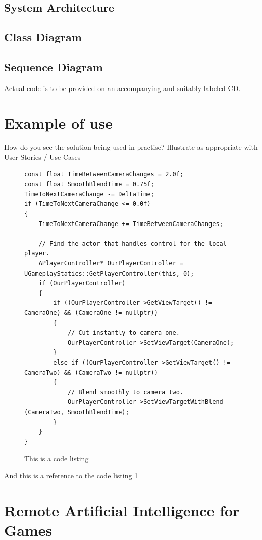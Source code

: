 \documentclass[12pt,a4paper,titlepage]{article}
\begin{document}
\subsection{System Architecture}

\subsection{Class Diagram}

\subsection{Sequence Diagram}

Actual code is to be provided on an accompanying and suitably labeled CD.

\section{Example of use}
How do you see the solution being used in practise? Illustrate as appropriate with User Stories / Use Cases 

\begin{figure}[H]
\begin{lstlisting}
const float TimeBetweenCameraChanges = 2.0f;
const float SmoothBlendTime = 0.75f;
TimeToNextCameraChange -= DeltaTime;
if (TimeToNextCameraChange <= 0.0f)
{
    TimeToNextCameraChange += TimeBetweenCameraChanges;

    // Find the actor that handles control for the local player.
    APlayerController* OurPlayerController = UGameplayStatics::GetPlayerController(this, 0);
    if (OurPlayerController)
    {
        if ((OurPlayerController->GetViewTarget() != CameraOne) && (CameraOne != nullptr))
        {
            // Cut instantly to camera one.
            OurPlayerController->SetViewTarget(CameraOne);
        }
        else if ((OurPlayerController->GetViewTarget() != CameraTwo) && (CameraTwo != nullptr))
        {
            // Blend smoothly to camera two.
            OurPlayerController->SetViewTargetWithBlend (CameraTwo, SmoothBlendTime);
        }
    }
}
\end{lstlisting}
	\caption{This is a code listing}
	\label{code:raig header file}
\end{figure}



And this is a reference to the code listing \ref{code:raig header file}

\section{Remote Artificial Intelligence for Games}
\end{document}
